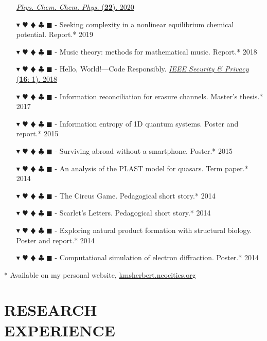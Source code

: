 \documentclass[overlapped, 10pt]{res} %
\newcommand{\physics}{$\blacktriangledown$}
\newcommand{\biochem}{$\varheartsuit$}
\newcommand{\shannon}{$\vardiamondsuit$}
\newcommand{\classic}{$\clubsuit$}
\newcommand{\quantum}{$\blacksquare$}
\newcommand{\physicscolor}{\color{YellowOrange}}
\newcommand{\biochemcolor}{\color{Emerald}}
\newcommand{\shannoncolor}{\color{Goldenrod}}
\newcommand{\classiccolor}{\color{Cyan}}
\newcommand{\quantumcolor}{\color{RedOrange}}
\newcommand{\tag}[1]{
    {\IfSubStr{#1}{\physics}{\physicscolor}{\color{White}}\physics}
    {\IfSubStr{#1}{\biochem}{\biochemcolor}{\color{White}}\biochem}
    {\IfSubStr{#1}{\shannon}{\shannoncolor}{\color{White}}\shannon}
    {\IfSubStr{#1}{\classic}{\classiccolor}{\color{White}}\classic}
    {\IfSubStr{#1}{\quantum}{\quantumcolor}{\color{White}}\quantum}
}
\begin{document}
\begin{resume}
\begin{itemize}
    \hfill \href{https://arxiv.org/abs/2006.03807}{\textit{Phys. Chem. Chem. Phys.} (\textbf{22}). 2020}
\item[\tag{\biochem}-] Seeking complexity in a nonlinear equilibrium chemical potential.
    \hfill Report.* 2019
\item[\tag{}-] Music theory: methods for mathematical music.
    \hfill Report.* 2018
\item[\tag{\classic}-] Hello, World!—Code Responsibly.
    \hfill \href{https://ieeexplore.ieee.org/document/8283486}{\textit{IEEE Security \& Privacy} (\textbf{16}: 1). 2018}
\item[\tag{\shannon\classic}-] Information reconciliation for erasure channels.
    \hfill Master's thesis.* 2017
\item[\tag{\physics\shannon\classic}-] Information entropy of 1D quantum systems.
    \hfill Poster and report.* 2015
\item[\tag{}-] Surviving abroad without a smartphone.
    \hfill Poster.* 2015
\item[\tag{\physics}-] An analysis of the PLAST model for quasars.
    \hfill Term paper.* 2014
\item[\tag{\shannon}-] The Circus Game.
    \hfill Pedagogical short story.* 2014
\item[\tag{\physics}-] Scarlet's Letters.
    \hfill Pedagogical short story.* 2014
\item[\tag{\biochem}-] Exploring natural product formation with structural biology.
    \hfill Poster and report.* 2014
\item[\tag{\physics\classic}-] Computational simulation of electron diffraction.
    \hfill Poster.* 2014
\end{itemize}

* Available on my personal website, \href{kmsherbert.neocities.org}{kmsherbert.neocities.org}


\section{RESEARCH\\EXPERIENCE}


\end{resume}
\end{document}
